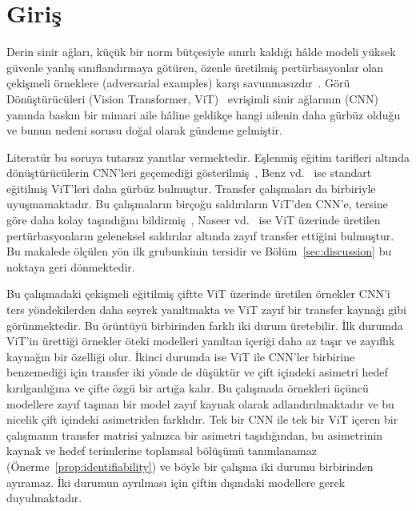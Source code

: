 \section{Giriş}
\label{sec:introduction}

Derin sinir ağları, küçük bir norm bütçesiyle sınırlı kaldığı hâlde modeli yüksek güvenle yanlış sınıflandırmaya götüren, özenle üretilmiş pertürbasyonlar olan çekişmeli örneklere (adversarial examples) karşı savunmasızdır~\cite{szegedy2014intriguing, goodfellow2015explaining}. Görü Dönüştürücüleri (Vision Transformer, ViT)~\cite{dosovitskiy2021image, vaswani2017attention} evrişimli sinir ağlarının (CNN)~\cite{he2016deep} yanında baskın bir mimari aile hâline geldikçe hangi ailenin daha gürbüz olduğu ve bunun nedeni sorusu doğal olarak gündeme gelmiştir.

Literatür bu soruya tutarsız yanıtlar vermektedir. Eşlenmiş eğitim tarifleri altında dönüştürücülerin CNN'leri geçemediği gösterilmiş~\cite{bai2021transformers}, Benz vd.~\cite{benz2021adversarial} ise standart eğitilmiş ViT'leri daha gürbüz bulmuştur. Transfer çalışmaları da birbiriyle uyuşmamaktadır. Bu çalışmaların birçoğu saldırıların ViT'den CNN'e, tersine göre daha kolay taşındığını bildirmiş~\cite{mahmood2021robustness, benz2021adversarial, shao2022adversarial}, Naseer vd.~\cite{naseer2022improving} ise ViT üzerinde üretilen pertürbasyonların geleneksel saldırılar altında zayıf transfer ettiğini bulmuştur. Bu makalede ölçülen yön ilk grubunkinin tersidir ve Bölüm~\ref{sec:discussion} bu noktaya geri dönmektedir.

Bu çalışmadaki çekişmeli eğitilmiş çiftte ViT üzerinde üretilen örnekler CNN'i ters yöndekilerden daha seyrek yanıltmakta ve ViT zayıf bir transfer kaynağı gibi görünmektedir. Bu örüntüyü birbirinden farklı iki durum üretebilir. İlk durumda ViT'in ürettiği örnekler öteki modelleri yanıltan içeriği daha az taşır ve zayıflık kaynağın bir özelliği olur. İkinci durumda ise ViT ile CNN'ler birbirine benzemediği için transfer iki yönde de düşüktür ve çift içindeki asimetri hedef kırılganlığına ve çifte özgü bir artığa kalır. Bu çalışmada örnekleri üçüncü modellere zayıf taşınan bir model zayıf kaynak olarak adlandırılmaktadır ve bu nicelik çift içindeki asimetriden farklıdır. Tek bir CNN ile tek bir ViT içeren bir çalışmanın transfer matrisi yalnızca bir asimetri taşıdığından, bu asimetrinin kaynak ve hedef terimlerine toplamsal bölüşümü tanımlanamaz (Önerme~\ref{prop:identifiability}) ve böyle bir çalışma iki durumu birbirinden ayıramaz. İki durumun ayrılması için çiftin dışındaki modellere gerek duyulmaktadır.

